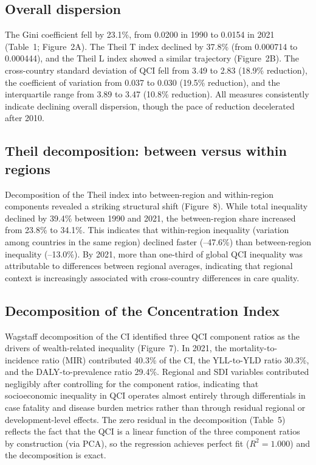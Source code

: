 \documentclass[12pt]{article}
\begin{document}
\subsection{Overall dispersion}

The Gini coefficient fell by 23.1\%, from 0.0200 in 1990 to 0.0154 in 2021 (Table~1; Figure~2A). The Theil T index declined by 37.8\% (from 0.000714 to 0.000444), and the Theil L index showed a similar trajectory (Figure~2B). The cross-country standard deviation of QCI fell from 3.49 to 2.83 (18.9\% reduction), the coefficient of variation from 0.037 to 0.030 (19.5\% reduction), and the interquartile range from 3.89 to 3.47 (10.8\% reduction). All measures consistently indicate declining overall dispersion, though the pace of reduction decelerated after 2010.

\subsection{Theil decomposition: between versus within regions}

Decomposition of the Theil index into between-region and within-region components revealed a striking structural shift (Figure~8). While total inequality declined by 39.4\% between 1990 and 2021, the between-region share increased from 23.8\% to 34.1\%. This indicates that within-region inequality (variation among countries in the same region) declined faster (--47.6\%) than between-region inequality (--13.0\%). By 2021, more than one-third of global QCI inequality was attributable to differences between regional averages, indicating that regional context is increasingly associated with cross-country differences in care quality.

\subsection{Decomposition of the Concentration Index}

Wagstaff decomposition of the CI identified three QCI component ratios as the drivers of wealth-related inequality (Figure~7). In 2021, the mortality-to-incidence ratio (MIR) contributed 40.3\% of the CI, the YLL-to-YLD ratio 30.3\%, and the DALY-to-prevalence ratio 29.4\%. Regional and SDI variables contributed negligibly after controlling for the component ratios, indicating that socioeconomic inequality in QCI operates almost entirely through differentials in case fatality and disease burden metrics rather than through residual regional or development-level effects. The zero residual in the decomposition (Table~5) reflects the fact that the QCI is a linear function of the three component ratios by construction (via PCA), so the regression achieves perfect fit ($R^2 = 1.000$) and the decomposition is exact.
\end{document}
